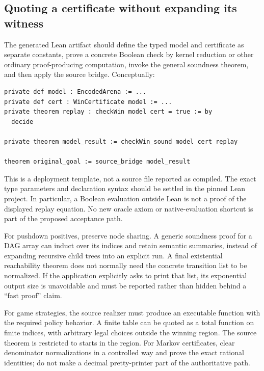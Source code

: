 \subsection{Quoting a certificate without expanding its witness}
The generated Lean artifact should define the typed model and certificate as
separate constants, prove a concrete Boolean check by kernel reduction or other
ordinary proof-producing computation, invoke the general soundness theorem,
and then apply the source bridge. Conceptually:
\begin{lstlisting}
private def model : EncodedArena := ...
private def cert : WinCertificate model := ...
private theorem replay : checkWin model cert = true := by
  decide

private theorem model_result := checkWin_sound model cert replay

theorem original_goal := source_bridge model_result
\end{lstlisting}
This is a deployment template, not a source file reported as compiled. The
exact type parameters and declaration syntax should be settled in the pinned
Lean project. In particular, a Boolean evaluation outside Lean is not a proof
of the displayed replay equation. No new oracle axiom or native-evaluation
shortcut is part of the proposed acceptance path.

For pushdown positives, preserve node sharing. A generic soundness proof for a
DAG array can induct over its indices and retain semantic summaries, instead
of expanding recursive child trees into an explicit run. A final existential
reachability theorem does not normally need the concrete transition list to
be normalized. If the application explicitly asks to print that list, its
exponential output size is unavoidable and must be reported rather than hidden
behind a ``fast proof'' claim.

For game strategies, the source realizer must produce an executable function
with the required policy behavior. A finite table can be quoted as a total
function on finite indices, with arbitrary legal choices outside the winning
region. The source theorem is restricted to starts in the region. For Markov
certificates, clear denominator normalizations in a controlled way and prove
the exact rational identities; do not make a decimal pretty-printer part of
the authoritative path.

